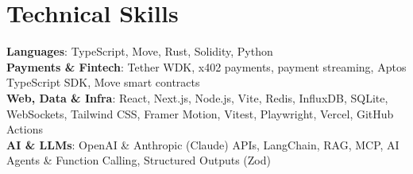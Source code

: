 \documentclass[letterpaper,9pt]{extarticle}
\begin{document}
\section{Technical Skills}
 \begin{itemize}[leftmargin=0.15in, label={}]
    \small{\item{
     \textbf{Languages}{: TypeScript, Move, Rust, Solidity, Python} \\
     \textbf{Payments \& Fintech}{: Tether WDK, x402 payments, payment streaming, Aptos TypeScript SDK, Move smart contracts} \\
     \textbf{Web, Data \& Infra}{: React, Next.js, Node.js, Vite, Redis, InfluxDB, SQLite, WebSockets, Tailwind CSS, Framer Motion, Vitest, Playwright, Vercel, GitHub Actions} \\
     \textbf{AI \& LLMs}{: OpenAI \& Anthropic (Claude) APIs, LangChain, RAG, MCP, AI Agents \& Function Calling, Structured Outputs (Zod)}
    }}
 \end{itemize}
\end{document}
